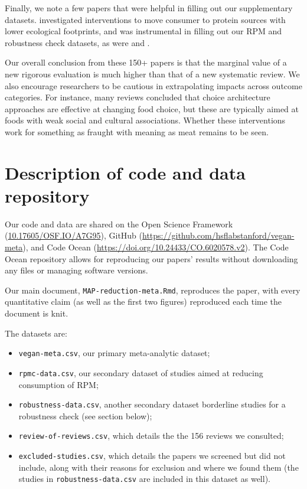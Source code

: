 \documentclass[sn-nature,referee,pdflatex]{sn-jnl}
\begin{document}
Finally, we note a few papers that were helpful in filling out our
supplementary datasets. \citep{ronto2022} investigated interventions to
move consumer to protein sources with lower ecological footprints, and
was instrumental in filling out our RPM and robustness check datasets,
as were \citep{kwasny2022} and \citep{grummon2023}.

Our overall conclusion from these 150+ papers is that the marginal value
of a new rigorous evaluation is much higher than that of a new
systematic review. We also encourage researchers to be cautious in
extrapolating impacts across outcome categories. For instance, many
reviews concluded that choice architecture approaches are effective at
changing food choice, but these are typically aimed at foods with weak
social and cultural associations. Whether these interventions work for
something as fraught with meaning as meat remains to be seen.

\section{Description of code and data
repository}\label{description-of-code-and-data-repository}

Our code and data are shared on the Open Science Framework
(\url{10.17605/OSF.IO/A7G95}), GitHub
(\url{https://github.com/hsflabstanford/vegan-meta}), and Code Ocean
(\url{https://doi.org/10.24433/CO.6020578.v2}). The Code Ocean
repository allows for reproducing our papers' results without
downloading any files or managing software versions.

Our main document, \texttt{MAP-reduction-meta.Rmd}, reproduces the
paper, with every quantitative claim (as well as the first two figures)
reproduced each time the document is knit.

The datasets are:

\begin{itemize}
\item
  \texttt{vegan-meta.csv}, our primary meta-analytic dataset;
\item
  \texttt{rpmc-data.csv}, our secondary dataset of studies aimed at
  reducing consumption of RPM;
\item
  \texttt{robustness-data.csv}, another secondary dataset borderline
  studies for a robustness check (see section below);
\item
  \texttt{review-of-reviews.csv}, which details the the 156 reviews we
  consulted;
\item
  \texttt{excluded-studies.csv}, which details the papers we screened
  but did not include, along with their reasons for exclusion and where
  we found them (the studies in \texttt{robustness-data.csv} are
  included in this dataset as well).
\end{itemize}
\end{document}
